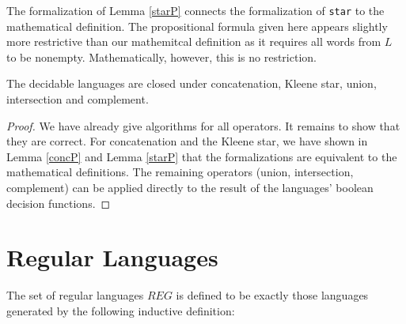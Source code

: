     
    The formalization of Lemma \ref{starP} connects the formalization of \lstinline{star} to the mathematical definition. The propositional formula given here appears slightly more restrictive than our mathemitcal definition as it requires all words from $L$ to be nonempty. 
    Mathematically, however, this is no restriction. 
    


    \begin{theorem}{}
        \label{DecLangClosed}
        The decidable languages are closed under concatenation, Kleene star, union, intersection and complement. 
    \end{theorem}
    \begin{proof}
        We have already give algorithms for all operators. 
        It remains to show that they are correct.
        For concatenation and the Kleene star, we have shown in Lemma \ref{concP} and Lemma \ref{starP} that the formalizations are equivalent to the mathematical definitions. 
        The remaining operators (union, intersection, complement) can be applied directly to the result of the languages' boolean decision functions.
    \end{proof}

    


    \section{Regular Languages}


    \begin{definition}{}
        \label{REG}
        The set of regular languages $REG$ is defined to be exactly those languages generated by the following inductive definition:
        
    \end{definition}


